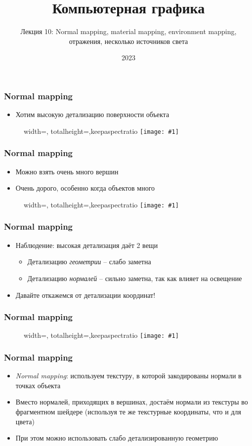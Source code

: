 \documentclass[10pt]{beamer}
\title{Компьютерная графика}
\subtitle{Лекция 10: Normal mapping, material mapping, environment mapping, отражения, несколько источников света}
\date{2023}
\newcommand{\slideimage}[1]{
  \begin{figure}
    \begin{adjustbox}{width=\textwidth, totalheight=\textheight-2\baselineskip-2\baselineskip,keepaspectratio}
      \texttt{[image: \#1]}
    \end{adjustbox}
  \end{figure}
}
\begin{document}
\frame{\titlepage}

\begin{frame}[fragile]
\frametitle{Normal mapping}
\begin{itemize}
\item Хотим высокую детализацию поверхности объекта
\end{itemize}
\slideimage{orange.png}
\end{frame}

\begin{frame}[fragile]
\frametitle{Normal mapping}
\begin{itemize}
\item Можно взять очень много вершин
\pause
\item Очень дорого, особенно когда объектов много
\end{itemize}
\slideimage{orange-mesh.png}
\end{frame}

\begin{frame}[fragile]
\frametitle{Normal mapping}
\begin{itemize}
\item Наблюдение: высокая детализация даёт 2 вещи
\begin{itemize}
\item Детализацию \textit{геометрии} -- слабо заметна
\item Детализацию \textit{нормалей} -- сильно заметна, так как влияет на освещение
\end{itemize}
\pause
\item Давайте откажемся от детализации координат!
\end{itemize}
\end{frame}

\begin{frame}[fragile]
\frametitle{Normal mapping}
\slideimage{orange-normal-map.png}
\end{frame}

\begin{frame}[fragile]
\frametitle{Normal mapping}
\begin{itemize}
\item \textit{Normal mapping}: используем текстуру, в которой закодированы нормали в точках объекта
\pause
\item Вместо нормалей, приходящих в вершинах, достаём нормали из текстуры во фрагментном шейдере (используя те же текстурные координаты, что и для цвета)
\pause
\item При этом можно использовать слабо детализированную геометрию
\end{itemize}
\end{frame}
\end{document}
